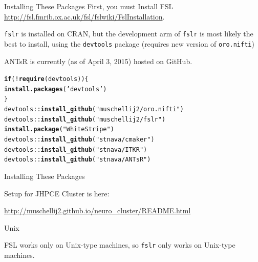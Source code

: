 \documentclass[11pt]{beamer}\usepackage[]{graphicx}\usepackage[]{color}
\makeatletter
\newcommand{\hlstr}[1]{\textcolor[rgb]{0.192,0.494,0.8}{#1}}%
\newcommand{\hlopt}[1]{\textcolor[rgb]{0,0,0}{#1}}%
\newcommand{\hlstd}[1]{\textcolor[rgb]{0.345,0.345,0.345}{#1}}%
\newcommand{\hlkwa}[1]{\textcolor[rgb]{0.161,0.373,0.58}{\textbf{#1}}}%
\newcommand{\hlkwd}[1]{\textcolor[rgb]{0.737,0.353,0.396}{\textbf{#1}}}%
\newenvironment{kframe}{%
 \def\at@end@of@kframe{}%
 \ifinner\ifhmode%
  \def\at@end@of@kframe{\end{minipage}}%
  \begin{minipage}{\columnwidth}%
 \fi\fi%
 \def\FrameCommand##1{\hskip\@totalleftmargin \hskip-\fboxsep
 \colorbox{shadecolor}{##1}\hskip-\fboxsep
     \hskip-\linewidth \hskip-\@totalleftmargin \hskip\columnwidth}%
 \MakeFramed {\advance\hsize-\width
   \@totalleftmargin\z@ \linewidth\hsize
   \@setminipage}}%
 {\par\unskip\endMakeFramed%
 \at@end@of@kframe}
\newenvironment{knitrout}{}{} %
\makeatother
\begin{document}
\begin{frame}[fragile]{Installing These Packages}
First, you must Install FSL \href{http://fsl.fmrib.ox.ac.uk/fsl/fslwiki/FslInstallation}{http://fsl.fmrib.ox.ac.uk/fsl/fslwiki/FslInstallation}.  \\
\vspace{0.5cm}

\verb|fslr| is installed on CRAN, but the development arm of \verb|fslr| is most likely the best to install, using the \verb|devtools| package (requires new version of \verb|oro.nifti|)

ANTsR is currently (as of April 3, 2015) hosted on GitHub.  

\begin{knitrout}
\color{fgcolor}\begin{kframe}
\begin{alltt}
\hlkwa{if} \hlstd{(}\hlopt{!}\hlkwd{require}\hlstd{(devtools))\{}
        \hlkwd{install.packages}\hlstd{(}\hlstr{'devtools'}\hlstd{)}
\hlstd{\}}
\hlstd{devtools}\hlopt{::}\hlkwd{install_github}\hlstd{(}\hlstr{"muschellij2/oro.nifti"}\hlstd{)}
\hlstd{devtools}\hlopt{::}\hlkwd{install_github}\hlstd{(}\hlstr{"muschellij2/fslr"}\hlstd{)}
\hlkwd{install.package}\hlstd{(}\hlstr{"WhiteStripe"}\hlstd{)}
\hlstd{devtools}\hlopt{::}\hlkwd{install_github}\hlstd{(}\hlstr{"stnava/cmaker"}\hlstd{)}
\hlstd{devtools}\hlopt{::}\hlkwd{install_github}\hlstd{(}\hlstr{"stnava/ITKR"}\hlstd{)}
\hlstd{devtools}\hlopt{::}\hlkwd{install_github}\hlstd{(}\hlstr{"stnava/ANTsR"}\hlstd{)}
\end{alltt}
\end{kframe}
\end{knitrout}

\end{frame}

\begin{frame}[fragile]{Installing These Packages}

Setup for JHPCE Cluster is here:

\url{http://muschellij2.github.io/neuro_cluster/README.html
}

\end{frame}



\begin{frame}[fragile]{Unix}

FSL works only on Unix-type machines, so \verb|fslr| only works on Unix-type machines. 

\end{frame}
\end{document}
